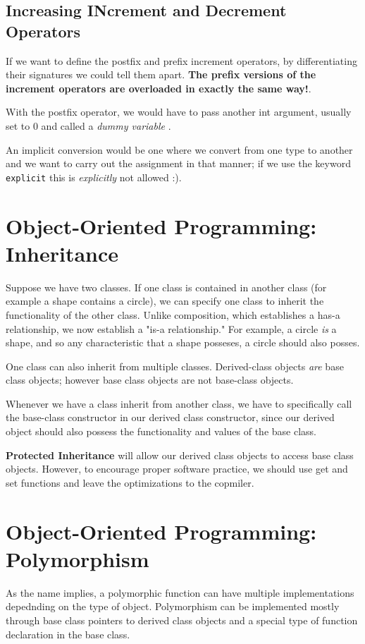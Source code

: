 \documentclass{article}
\begin{document}
\subsection{Increasing INcrement and Decrement Operators}
If we want to define the postfix and prefix increment operators, by differentiating their signatures we could
tell them apart. \textbf{The prefix versions of the increment operators are overloaded in exactly the same way!}.

With the postfix operator, we would have to pass another int argument, usually set to 0 and called 
a \textit{dummy variable }.

An implicit conversion would be one where we convert from one type to another and we want to carry out the 
assignment in that manner; if we use the keyword \texttt{explicit} this is \textit{explicitly} not allowed :).
\newpage
\section{Object-Oriented Programming: Inheritance}
Suppose we have two classes. If one class is contained in another class (for example a shape contains a circle),
we can specify one class to inherit the functionality of the other class. Unlike composition, which establishes
a has-a relationship, we now establish a "is-a relationship." For example, a circle \textit{is} a shape, and 
so any characteristic that a shape posseses, a circle should also posses.

One class can also inherit from multiple classes. Derived-class objects \textit{are} base class objects; however
base class objects are not base-class objects.

Whenever we have a class inherit from another class, we have to specifically call the base-class constructor in
our  derived class constructor, since our derived object should also possess the functionality and values
of the base class.

\textbf{Protected Inheritance} will allow our derived class objects to access base class objects. However, 
to encourage proper software practice, we should use get and set functions and leave the optimizations to the 
copmiler.
\newpage
\section{Object-Oriented Programming: Polymorphism}
As the name implies, a polymorphic function can have multiple implementations depednding on the type of object.
Polymorphism can be implemented mostly through base class pointers to derived class objects and a special type of
function declaration in the base class.
\end{document}
